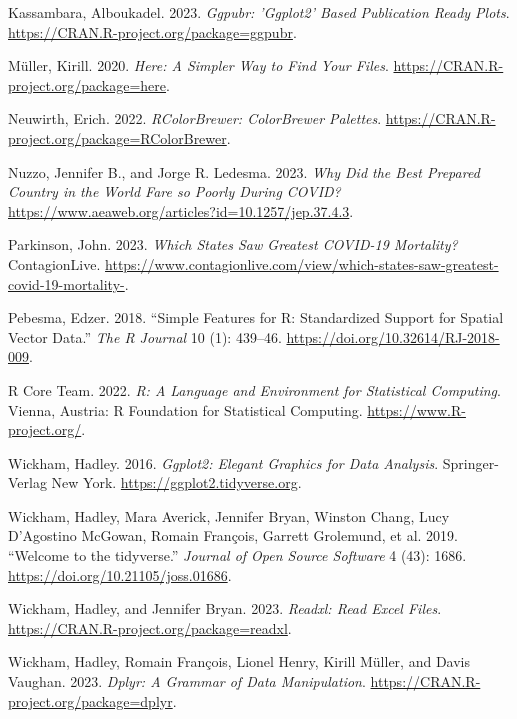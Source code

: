 \documentclass[
  letterpaper,
  DIV=11,
  numbers=noendperiod]{scrartcl}
\newlength{\cslhangindent}
\newenvironment{CSLReferences}[2] %
 {\begin{list}{}{%
  \setlength{\itemindent}{0pt}
  \setlength{\leftmargin}{0pt}
  \setlength{\parsep}{0pt}
  \ifodd #1
   \setlength{\leftmargin}{\cslhangindent}
   \setlength{\itemindent}{-1\cslhangindent}
  \fi
  \setlength{\itemsep}{#2\baselineskip}}}
 {\end{list}}
\begin{document}
\begin{CSLReferences}{1}{0}
Kassambara, Alboukadel. 2023. \emph{Ggpubr: 'Ggplot2' Based Publication
Ready Plots}. \url{https://CRAN.R-project.org/package=ggpubr}.

Müller, Kirill. 2020. \emph{Here: A Simpler Way to Find Your Files}.
\url{https://CRAN.R-project.org/package=here}.

Neuwirth, Erich. 2022. \emph{RColorBrewer: ColorBrewer Palettes}.
\url{https://CRAN.R-project.org/package=RColorBrewer}.

Nuzzo, Jennifer B., and Jorge R. Ledesma. 2023. \emph{Why Did the Best
Prepared Country in the World Fare so Poorly During COVID?}
\url{https://www.aeaweb.org/articles?id=10.1257/jep.37.4.3}.

Parkinson, John. 2023. \emph{Which States Saw Greatest COVID-19
Mortality?} ContagionLive.
\url{https://www.contagionlive.com/view/which-states-saw-greatest-covid-19-mortality-}.

Pebesma, Edzer. 2018. {``{Simple Features for R: Standardized Support
for Spatial Vector Data}.''} \emph{{The R Journal}} 10 (1): 439--46.
\url{https://doi.org/10.32614/RJ-2018-009}.

R Core Team. 2022. \emph{R: A Language and Environment for Statistical
Computing}. Vienna, Austria: R Foundation for Statistical Computing.
\url{https://www.R-project.org/}.

Wickham, Hadley. 2016. \emph{Ggplot2: Elegant Graphics for Data
Analysis}. Springer-Verlag New York.
\url{https://ggplot2.tidyverse.org}.

Wickham, Hadley, Mara Averick, Jennifer Bryan, Winston Chang, Lucy
D'Agostino McGowan, Romain François, Garrett Grolemund, et al. 2019.
{``Welcome to the {tidyverse}.''} \emph{Journal of Open Source Software}
4 (43): 1686. \url{https://doi.org/10.21105/joss.01686}.

Wickham, Hadley, and Jennifer Bryan. 2023. \emph{Readxl: Read Excel
Files}. \url{https://CRAN.R-project.org/package=readxl}.

Wickham, Hadley, Romain François, Lionel Henry, Kirill Müller, and Davis
Vaughan. 2023. \emph{Dplyr: A Grammar of Data Manipulation}.
\url{https://CRAN.R-project.org/package=dplyr}.


\end{CSLReferences}
\end{document}

